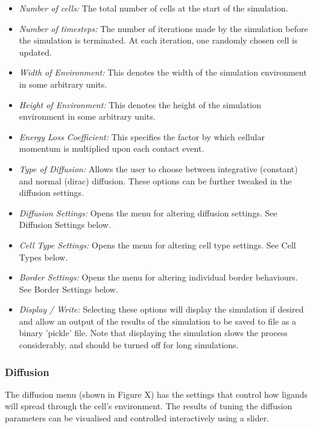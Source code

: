 \documentclass[12pt]{article}
\begin{document}
\begin{itemize}
\item {\itshape Number of cells:} The total number of cells at the start 
of the simulation.
\item {\itshape Number of timesteps:} The number of iterations made by 
the simulation before the simulation is terminated. At each iteration, 
one randomly chosen cell is updated.
\item {\itshape Width of Environment:} This denotes the width of the 
simulation environment in some arbitrary units.
\item {\itshape Height of Environment:} This denotes the height of the 
simulation environment in some arbitrary units.
\item {\itshape Energy Loss Coefficient: }This specifies the factor by 
which cellular momentum is multiplied upon each contact event.
\item {\itshape Type of Diffusion:} Allows the user to choose between 
integrative (constant) and normal (dirac) diffusion. These options can 
be further tweaked in the diffusion settings.
\item {\itshape Diffusion Settings:} Opens the menu for altering 
diffusion settings. See Diffusion Settings below.
\item {\itshape Cell Type Settings: }Opens the menu for altering cell 
type settings. See Cell Types below.
\item {\itshape Border Settings: }Opens the menu for altering individual 
border behaviours. See Border Settings below.
\item {\itshape Display / Write:} Selecting these options will display 
the simulation if desired and allow an output of the results of the 
simulation to be saved to file as a binary 'pickle' file. Note that 
displaying the simulation slows the process considerably, and should be 
turned off for long simulations.
\setcounter{numberedCntG}{\theenumi}
\end{itemize}


\subsubsection{Diffusion}
The diffusion menu (shown in Figure X) has the settings that control how 
ligands will spread through the cell's environment. The results of 
tuning the diffusion parameters can be visualised and controlled 
interactively using a slider.
\end{document}
